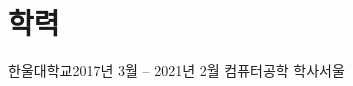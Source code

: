 \section{학력}
\resumeSubHeadingListStart
    \resumeSubheading
      {한울대학교}{2017년 3월 -- 2021년 2월}
      {컴퓨터공학 학사}{서울}
\resumeSubHeadingListEnd
